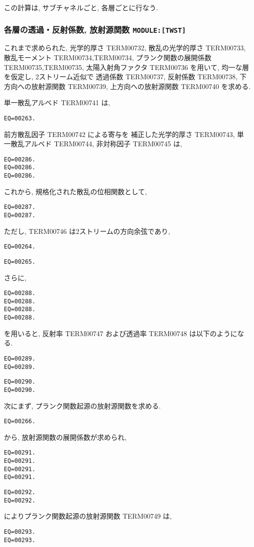 この計算は, サブチャネルごと, 各層ごとに行なう.

\subsubsection{各層の透過・反射係数, 放射源関数 \texttt{MODULE:[TWST]}}

これまで求められた, 光学的厚さ TERM00732, 散乱の光学的厚さ TERM00733,
散乱モーメント TERM00734,TERM00734, プランク関数の展開係数 TERM00735,TERM00735,
太陽入射角ファクタ TERM00736 を用いて,
均一な層を仮定し, 2ストリーム近似で
透過係数 TERM00737, 反射係数 TERM00738, 下方向への放射源関数 TERM00739,
上方向への放射源関数 TERM00740 を求める.

単一散乱アルベド TERM00741 は,
\begin{verbatim}
EQ=00263.
\end{verbatim}
前方散乱因子 TERM00742 による寄与を
補正した光学的厚さ TERM00743,
単一散乱アルベド TERM00744, 非対称因子 TERM00745 は,
\begin{verbatim}
EQ=00286.
EQ=00286.
EQ=00286.
\end{verbatim}

これから, 規格化された散乱の位相関数として,
\begin{verbatim}
EQ=00287.
EQ=00287.
\end{verbatim}
ただし, TERM00746 は2ストリームの方向余弦であり,
\begin{verbatim}
EQ=00264.
\end{verbatim}
\begin{verbatim}
EQ=00265.
\end{verbatim}

さらに,
\begin{verbatim}
EQ=00288.
EQ=00288.
EQ=00288.
EQ=00288.
\end{verbatim}
を用いると, 反射率 TERM00747 および透過率 TERM00748 は以下のようになる.
\begin{verbatim}
EQ=00289.
EQ=00289.
\end{verbatim}
\begin{verbatim}
EQ=00290.
EQ=00290.
\end{verbatim}

次にまず, プランク関数起源の放射源関数を求める.
\begin{verbatim}
EQ=00266.
\end{verbatim}
から, 放射源関数の展開係数が求められ,
\begin{verbatim}
EQ=00291.
EQ=00291.
EQ=00291.
EQ=00291.
\end{verbatim}
\begin{verbatim}
EQ=00292.
EQ=00292.
\end{verbatim}
によりプランク関数起源の放射源関数 TERM00749 は,
\begin{verbatim}
EQ=00293.
EQ=00293.
\end{verbatim}

